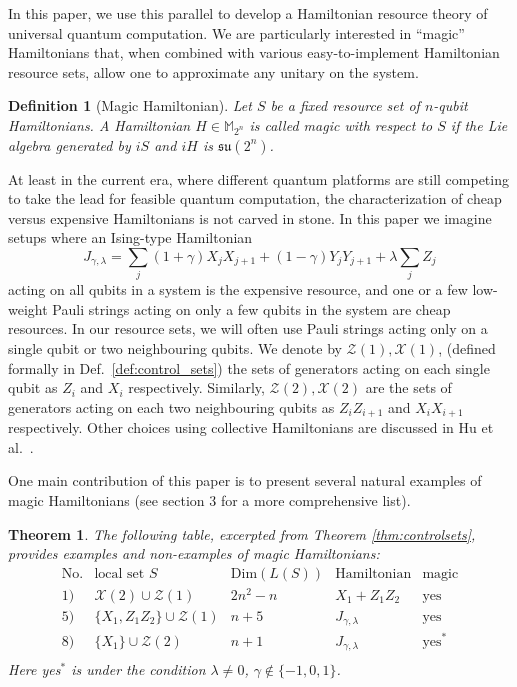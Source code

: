 \documentclass[12pt, a4-paper]{amsart}
\newcommand{\cX}{\mathcal{X}}
\newcommand{\cZ}{\mathcal{Z}}
\numberwithin{equation}{section}
\newcommand{\la}{\lambda}
\newcommand{\mz}{{\mathbb M}}
\newtheorem{theorem}[lemma]{Theorem}
\newtheorem{defi}[lemma]{Definition}
\begin{document}
In this paper, we use this parallel to develop a Hamiltonian resource theory of universal quantum computation. We are particularly interested in ``magic'' Hamiltonians that, when combined with various easy-to-implement Hamiltonian resource sets, allow one to approximate any unitary on the system. 
\begin{defi}[Magic Hamiltonian] Let $S$ be a fixed resource set of $n$-qubit Hamiltonians. A Hamiltonian $H\in \mz_{2^n}$ is called \emph{magic with respect to $S$} if the Lie algebra generated by $iS$ and $iH$ is $\mathfrak{su}(2^n)$.  
\end{defi}

At least in the current era, where different quantum platforms are still competing to take the lead for feasible quantum computation, the characterization of cheap versus expensive Hamiltonians is not carved in stone. In this paper we imagine setups where an Ising-type Hamiltonian \begin{equation}\label{eq:ising_intro}
    J_{\gamma, \lambda} = \sum_j (1+\gamma) X_j X_{j+1} + (1-\gamma)Y_j Y_{j+1} + \lambda \sum_j Z_j
\end{equation}
acting on all qubits in a system is the expensive resource, and one or a few low-weight Pauli strings acting on only a few qubits in the system are cheap resources. In our resource sets, we will often use Pauli strings acting only on a single qubit or two neighbouring qubits. We denote by $\cZ(1), \cX(1)$, (defined formally in Def.~\ref{def:control_sets}) the sets of generators acting on each single qubit as $Z_i$ and $X_i$ respectively. Similarly, $\cZ(2), \cX(2)$ are the sets of generators acting on each two neighbouring qubits as $Z_i Z_{i+1}$ and $X_i X_{i+1}$ respectively. Other choices using collective Hamiltonians are discussed in Hu et al.\ \cite{hu}.

One main contribution of this paper is to present several natural examples of magic Hamiltonians (see section 3 for a more comprehensive list). 
\begin{theorem}\label{sample} The following table, excerpted from Theorem \ref{thm:controlsets}, provides examples and non-examples of magic Hamiltonians: 
    \[ \begin{array}{c|c|c|c|c}
 \text{No.}& \text{local set } S & \text{Dim}(L(S)) & \text{Hamiltonian} & \text{magic} \\  \hline
 1)& \mathcal{X}(2)\cup \mathcal{Z}(1)& 2n^2-n& X_1+Z_{1}Z_2 & \text{yes}  \\ 
  5)&\{X_1,Z_1Z_2\}\cup \mathcal{Z}(1) & n+5 & J_{\gamma,\lambda} &  \text{yes}\\
  8)&\{X_1\}\cup \mathcal{Z}(2)  & n+1 & J_{\gamma,\lambda} & \text{yes}^* \\ 
  \end{array} \] 
Here yes$^*$ is under the condition $\la\neq 0$, $\gamma\notin\{-1,0,1\}$.
\end{theorem}
\end{document}
